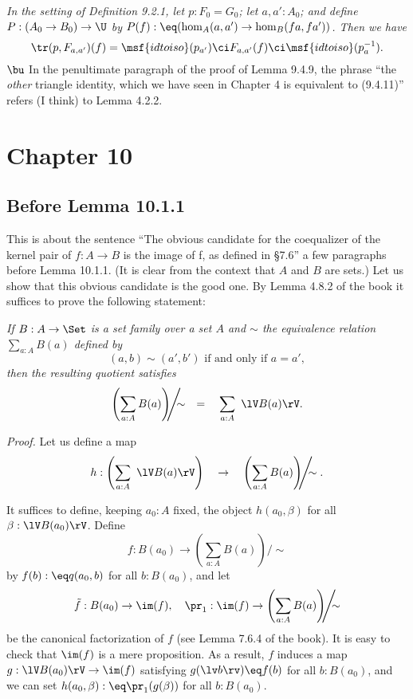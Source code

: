 \documentclass[12pt]{article}
\begin{document}
\emph{In the setting of Definition 9.2.1, let $p:F_0=G_0$; let $a,a':A_0$; and define $P:(A_0\to B_0)\to\U$ by $P(f):\eq(\hom_A(a,a')\to\hom_B(fa,fa'))$. Then we have} 
$$
\tr(p,F_{a,a'})(f)=\msf{idtoiso}(p_{a'})\ci F_{a,a'}(f)\ci\msf{idtoiso}(p_a^{-1}).
$$ 
$\bu$ In the penultimate paragraph of the proof of Lemma 9.4.9, the phrase ``the \emph{other} triangle identity, which we have seen in Chapter 4 is equivalent to (9.4.11)'' refers (I think) to Lemma 4.2.2.


\section{Chapter 10}

\subsection{Before Lemma 10.1.1}

This is about the sentence ``The obvious candidate for the coequalizer of the kernel pair of $f:A\to B$ is the image of f, as defined in \S7.6'' a few paragraphs before Lemma 10.1.1. (It is clear from the context that $A$ and $B$ are sets.) Let us show that this obvious candidate is the good one. By Lemma 4.8.2 of the book it suffices to prove the following statement:

\emph{If $B:A\to\Set$ is a set family over a set $A$ and $\sim$ the equivalence relation $\sum_{a:A}B(a)$ defined by 
$$
(a,b)\sim(a',b')\text{ if and only if }a=a',
$$ 
then the resulting quotient satisfies}
$$
\left(\sum_{a:A}B(a)\right)\!\!\!\Bigg/\!\!\!\!\sim\quad=\quad\sum_{a:A}\ \lV B(a)\rV.
$$

\nn\emph{Proof.} Let us define a map 
$$
h:\left(\sum_{a:A}\ \lV B(a)\rV\right)\quad\to\quad\left(\sum_{a:A}B(a)\right)\!\!\!\Bigg/\!\!\!\!\sim.
$$ 

It suffices to define, keeping $a_0:A$ fixed, the object $h(a_0,\beta)$ for all $\beta:\lV B(a_0)\rV$. Define 
$$
f:B(a_0)\to\left(\sum_{a:A}B(a)\right)\!\!\!\Bigg/\!\!\!\!\sim
$$ 
by $f(b):\eq q(a_0,b)$ for all $b:B(a_0)$, and let 
$$
\tilde f:B(a_0)\to\im(f),\quad\pr_1:\im(f)\to\left(\sum_{a:A}B(a)\right)\!\!\!\Bigg/\!\!\!\!\sim
$$ 
be the canonical factorization of $f$ (see Lemma 7.6.4 of the book). It is easy to check that $\im(f)$ is a mere proposition. As a result, $f$ induces a map $g:\lV B(a_0)\rV\to\im(f)$ satisfying $g(\lv b\rv)\eq f(b)$ for all $b:B(a_0)$, and we can set $h(a_0,\beta):\eq\pr_1(g(\beta))$ for all $b:B(a_0)$.
\end{document}
